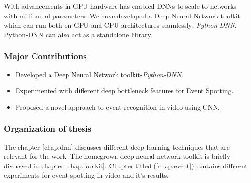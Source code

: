 With advancements in GPU hardware has enabled DNNs to scale to networks with millions of parameters.  We have developed a Deep Neural Network toolkit which can run both on GPU and CPU architectures seamlessly: \textit{Python-DNN}.  Python-DNN can also act as a standalone library.

\subsubsection{Major Contributions}
\begin{itemize}
\item Developed a Deep Neural Network toolkit-\textit{Python-DNN}. 
\item Experimented with different deep bottleneck features for Event Spotting.
\item Proposed a novel approach to event recognition in video using CNN.
\end{itemize}

\subsubsection{Organization of thesis}
The chapter \ref{chap:dnn} discusses different deep learning techniques that are relevant for the work.  The homegrown deep neural network toolkit is briefly discussed in chapter \ref{chap:toolkit}.  Chapter titled  (\ref{chap:event}) contains different experiments for event spotting in video and it's results.
